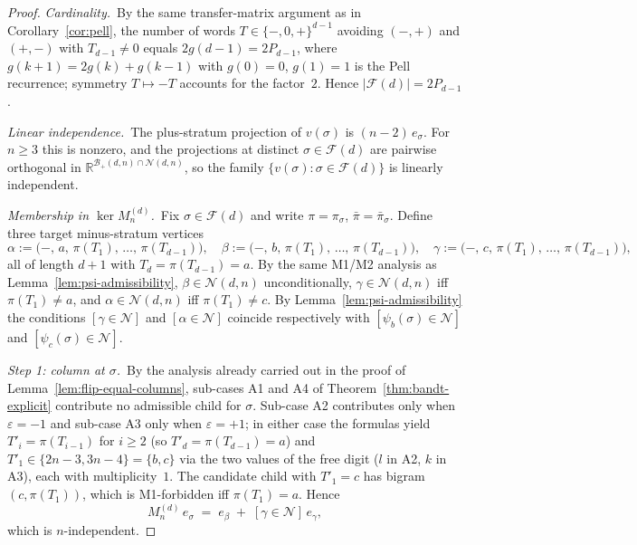 \documentclass{amsart}
\theoremstyle{definition}
\theoremstyle{remark}
\begin{document}
\begin{proof}
\textit{Cardinality.}\
By the same transfer-matrix argument as in
Corollary~\ref{cor:pell}, the number of words
$T \in \{-, 0, +\}^{d-1}$ avoiding $(-, +)$ and $(+, -)$ with
$T_{d-1} \neq 0$ equals $2 g(d-1) = 2 P_{d-1}$, where
$g(k+1) = 2 g(k) + g(k-1)$ with $g(0) = 0$, $g(1) = 1$ is the
Pell recurrence; symmetry $T \mapsto -T$ accounts for the
factor~$2$.  Hence $|\mathcal{F}(d)| = 2 P_{d-1}$.

\smallskip
\textit{Linear independence.}\
The plus-stratum projection of $v(\sigma)$ is $(n-2)\,e_\sigma$.
For $n \ge 3$ this is nonzero, and the projections at distinct
$\sigma \in \mathcal{F}(d)$ are pairwise orthogonal in
$\mathbb{R}^{\mathcal{B}_+(d, n) \cap \mathcal{N}(d, n)}$, so
the family $\{v(\sigma) : \sigma \in \mathcal{F}(d)\}$ is
linearly independent.

\smallskip
\textit{Membership in $\ker M_n^{(d)}$.}\
Fix $\sigma \in \mathcal{F}(d)$ and write $\pi = \pi_\sigma$,
$\bar\pi = \bar\pi_\sigma$.  Define three target minus-stratum
vertices
\[
  \alpha := \bigl(-,\, a,\, \pi(T_1),\, \ldots,\, \pi(T_{d-1})\bigr),\quad
  \beta  := \bigl(-,\, b,\, \pi(T_1),\, \ldots,\, \pi(T_{d-1})\bigr),\quad
  \gamma := \bigl(-,\, c,\, \pi(T_1),\, \ldots,\, \pi(T_{d-1})\bigr),
\]
all of length $d+1$ with $T_d = \pi(T_{d-1}) = a$.  By the same
M1/M2 analysis as Lemma~\ref{lem:psi-admissibility},
$\beta \in \mathcal{N}(d, n)$ unconditionally,
$\gamma \in \mathcal{N}(d, n)$ iff $\pi(T_1) \neq a$, and
$\alpha \in \mathcal{N}(d, n)$ iff $\pi(T_1) \neq c$.
By Lemma~\ref{lem:psi-admissibility} the conditions
$[\gamma \in \mathcal{N}]$ and $[\alpha \in \mathcal{N}]$
coincide respectively with $[\psi_b(\sigma) \in \mathcal{N}]$
and $[\psi_c(\sigma) \in \mathcal{N}]$.

\smallskip
\textit{Step 1: column at $\sigma$.}\
By the analysis already carried out in the proof of
Lemma~\ref{lem:flip-equal-columns}, sub-cases A1 and A4 of
Theorem~\ref{thm:bandt-explicit} contribute no admissible child
for $\sigma$.  Sub-case A2 contributes only when
$\varepsilon = -1$ and sub-case A3 only when $\varepsilon = +1$;
in either case the formulas yield $T'_i = \pi(T_{i-1})$ for
$i \ge 2$ (so $T'_d = \pi(T_{d-1}) = a$) and
$T'_1 \in \{2n-3, 3n-4\} = \{b, c\}$ via the two values of the
free digit ($l$ in A2, $k$ in A3), each with multiplicity~$1$.
The candidate child with $T'_1 = c$ has bigram $(c, \pi(T_1))$,
which is M1-forbidden iff $\pi(T_1) = a$.  Hence
\begin{equation}\label{eq:M-col-sigma}
  M_n^{(d)}\,e_\sigma \;=\; e_\beta \;+\; [\gamma \in \mathcal{N}]\,e_\gamma,
\end{equation}
which is $n$-independent.


\end{proof}
\end{document}
